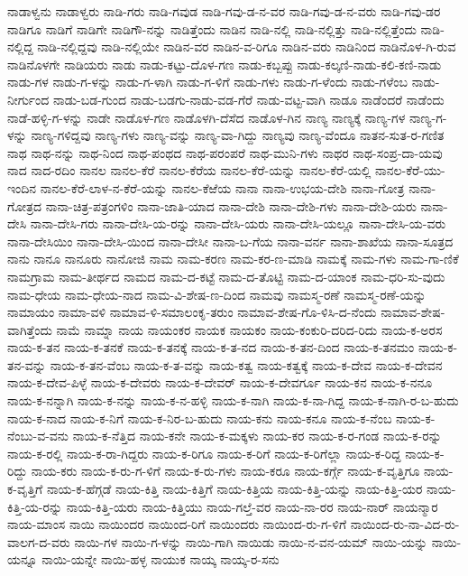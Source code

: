 ನಾಡಾಳ್ವನು
ನಾಡಾಳ್ವರು
ನಾಡಿ-ಗರು
ನಾಡಿ-ಗವುಡ
ನಾಡಿ-ಗವು-ಡ-ನ-ವರ
ನಾಡಿ-ಗವು-ಡ-ನ-ವರು
ನಾಡಿ-ಗವು-ಡರ
ನಾಡಿಗೂ
ನಾಡಿಗೆ
ನಾಡಿಗೇ
ನಾಡಿಗೌ-ನನ್ನು
ನಾಡಿತ್ತೆಂದು
ನಾಡಿನ
ನಾಡಿ-ನಲ್ಲಿ
ನಾಡಿ-ನಲ್ಲಿತ್ತು
ನಾಡಿ-ನಲ್ಲಿತ್ತೆಂದು
ನಾಡಿ-ನಲ್ಲಿದ್ದ
ನಾಡಿ-ನಲ್ಲಿದ್ದವು
ನಾಡಿ-ನಲ್ಲಿಯೇ
ನಾಡಿನ-ವರ
ನಾಡಿನ-ವ-ರಿಗೂ
ನಾಡಿನ-ವರು
ನಾಡಿನಿಂದ
ನಾಡಿನೊಳ-ಗಿ-ರುವ
ನಾಡಿನೊಳಗೇ
ನಾಡಿಯರು
ನಾಡು
ನಾಡು-ಕಟ್ಟು-ದೊಳ-ಗಣ
ನಾಡು-ಕಬ್ಬಪ್ಪು
ನಾಡು-ಕಲ್ಕಣಿ-ನಾಡು-ಕಲಿ-ಕಣಿ-ನಾಡು
ನಾಡು-ಗಳ
ನಾಡು-ಗ-ಳನ್ನು
ನಾಡು-ಗ-ಳಾಗಿ
ನಾಡು-ಗ-ಳಿಗೆ
ನಾಡು-ಗಳು
ನಾಡು-ಗ-ಳೆಂದು
ನಾಡು-ಗಳೆಂಬ
ನಾಡು-ನೀರ್ಗುಂದ
ನಾಡು-ಬಡ-ಗುಂದ
ನಾಡು-ಬಡಗು-ನಾಡು-ವಡ-ಗೆರೆ
ನಾಡು-ವಟ್ಟ-ವಾಗಿ
ನಾಡೂ
ನಾಡೆಂದರೆ
ನಾಡೆಂದು
ನಾಡೆ-ಹಳ್ಳಿ-ಗ-ಳನ್ನು
ನಾಡೇ
ನಾಡೊಳ-ಗಣ
ನಾಡೊಳಗಿ-ದೆಸೆದ
ನಾಡೊಳ-ಗಿನ
ನಾಣ್ಯ
ನಾಣ್ಯಕ್ಕೆ
ನಾಣ್ಯ-ಗಳ
ನಾಣ್ಯ-ಗ-ಳನ್ನು
ನಾಣ್ಯ-ಗಳಿದ್ದವು
ನಾಣ್ಯ-ಗಳು
ನಾಣ್ಯ-ವನ್ನು
ನಾಣ್ಯ-ವಾ-ಗಿದ್ದು
ನಾಣ್ಯವು
ನಾಣ್ಯ-ವೆಂದೂ
ನಾತನ-ಸುತ-ರ-ಗಣಿತ
ನಾಥ
ನಾಥ-ನನ್ನು
ನಾಥ-ನಿಂದ
ನಾಥ-ಪಂಥದ
ನಾಥ-ಪರಂಪರೆ
ನಾಥ-ಮುನಿ-ಗಳು
ನಾಥರ
ನಾಥ-ಸಂಪ್ರ-ದಾ-ಯವು
ನಾದ
ನಾದ-ರದಿಂ
ನಾನಲ
ನಾನಲ-ಕೆರೆ
ನಾನಲ-ಕೆರೆಯ
ನಾನಲ-ಕೆರೆ-ಯನ್ನು
ನಾನಲ-ಕೆರೆ-ಯಲ್ಲಿ
ನಾನಲ-ಕೆರೆ-ಯು-ಇಂದಿನ
ನಾನಲ-ಕೆರೆ-ಲಾಳ-ನ-ಕೆರೆ-ಯನ್ನು
ನಾನಲ-ಕೆಱೆಯ
ನಾನಾ
ನಾನಾ-ಉಭಯ-ದೇಶಿ
ನಾನಾ-ಗೋತ್ರ
ನಾನಾ-ಗೋತ್ರದ
ನಾನಾ-ಚಿತ್ರ-ಪತ್ರಂಗಳಿಂ
ನಾನಾ-ಜಾತಿ-ಯಾದ
ನಾನಾ-ದೇಶಿ
ನಾನಾ-ದೇಶಿ-ಗಳು
ನಾನಾ-ದೇಶಿ-ಯರು
ನಾನಾ-ದೇಸಿ
ನಾನಾ-ದೇಸಿ-ಗರು
ನಾನಾ-ದೇಸಿ-ಯ-ರನ್ನು
ನಾನಾ-ದೇಸಿ-ಯರು
ನಾನಾ-ದೇಸಿ-ಯಲ್ಲೂ
ನಾನಾ-ದೇಸಿ-ಯ-ವರು
ನಾನಾ-ದೇಸಿಯಿಂ
ನಾನಾ-ದೇಸಿ-ಯಿಂದ
ನಾನಾ-ದೇಸೀ
ನಾನಾ-ಬ-ಗೆಯ
ನಾನಾ-ವರ್ನ
ನಾನಾ-ಶಾಖೆಯ
ನಾನಾ-ಸೂತ್ರದ
ನಾನು
ನಾನೂ
ನಾನೂರು
ನಾನೋಜಿ
ನಾಮ
ನಾಮ-ಕರಣ
ನಾಮ-ಕರ-ಣ-ಮಾಡಿ
ನಾಮಕ್ಕೆ
ನಾಮ-ಗಳು
ನಾಮ-ಗಾ-ಣಿಕೆ
ನಾಮಗ್ರಾಮ
ನಾಮ-ತೀರ್ಥದ
ನಾಮದ
ನಾಮ-ದ-ಕಟ್ಟೆ
ನಾಮ-ದ-ತೊಟ್ಟಿ
ನಾಮ-ದ-ಯಾಂಕ
ನಾಮ-ಧರಿ-ಸು-ವುದು
ನಾಮ-ಧೇಯ
ನಾಮ-ಧೇಯ-ನಾದ
ನಾಮ-ವಿ-ಶೇಷ-ಣ-ದಿಂದ
ನಾಮವು
ನಾಮಸ್ಮ-ರಣೆ
ನಾಮಸ್ಮ-ರಣೆ-ಯನ್ನು
ನಾಮಾಯಂ
ನಾಮಾ-ವಳಿ
ನಾಮಾವ-ಳಿ-ಸಮಾಲಂಕೃ-ತರುಂ
ನಾಮಾವ-ಶೇಷ-ಗೊ-ಳಿಸಿ-ದ-ನೆಂದು
ನಾಮಾವ-ಶೇಷ-ವಾಗಿತ್ತೆಂದು
ನಾಮೆ
ನಾಮ್ನಾ
ನಾಯ
ನಾಯಂಕರ
ನಾಯಕ
ನಾಯಕಂ
ನಾಯ-ಕಂಕುರಿ-ದರಿದ-ರಿದು
ನಾಯ-ಕ-ಅರಸ
ನಾಯ-ಕ-ತನ
ನಾಯ-ಕ-ತನಕೆ
ನಾಯ-ಕ-ತನಕ್ಕೆ
ನಾಯ-ಕ-ತ-ನದ
ನಾಯ-ಕ-ತನ-ದಿಂದ
ನಾಯ-ಕ-ತನಮಂ
ನಾಯ-ಕ-ತನ-ವನ್ನು
ನಾಯ-ಕ-ತನ-ವೆಂಬ
ನಾಯ-ಕ-ತ-ವನ್ನು
ನಾಯ-ಕತ್ವ
ನಾಯ-ಕತ್ವಕ್ಕೆ
ನಾಯ-ಕ-ದೇವ
ನಾಯ-ಕ-ದೇವನ
ನಾಯ-ಕ-ದೇವ-ಪಿಳ್ಳೆ
ನಾಯ-ಕ-ದೇವರು
ನಾಯ-ಕ-ದೇವರ್
ನಾಯ-ಕ-ದೇವರ್ಗೂ
ನಾಯ-ಕನ
ನಾಯ-ಕ-ನನೂ
ನಾಯ-ಕ-ನನ್ನಾಗಿ
ನಾಯ-ಕ-ನನ್ನು
ನಾಯ-ಕ-ನ-ಹಳ್ಳಿ
ನಾಯ-ಕ-ನಾಗಿ
ನಾಯ-ಕ-ನಾ-ಗಿದ್ದ
ನಾಯ-ಕ-ನಾಗಿ-ರ-ಬ-ಹುದು
ನಾಯ-ಕ-ನಾದ
ನಾಯ-ಕ-ನಿಗೆ
ನಾಯ-ಕ-ನಿರ-ಬ-ಹುದು
ನಾಯ-ಕನು
ನಾಯ-ಕನೂ
ನಾಯ-ಕ-ನೆಂಬ
ನಾಯ-ಕ-ನೆಂಬು-ವ-ವನು
ನಾಯ-ಕ-ನೆತ್ತಿದ
ನಾಯ-ಕನೇ
ನಾಯ-ಕ-ಮಕ್ಕಳು
ನಾಯ-ಕರ
ನಾಯ-ಕ-ರ-ಗಂಡ
ನಾಯ-ಕ-ರನ್ನು
ನಾಯ-ಕ-ರಲ್ಲಿ
ನಾಯ-ಕ-ರಾ-ಗಿದ್ದರು
ನಾಯ-ಕ-ರಿಗೂ
ನಾಯ-ಕ-ರಿಗೆ
ನಾಯ-ಕ-ರಿಗೆಲ್ಲಾ
ನಾಯ-ಕ-ರಿದ್ದ
ನಾಯ-ಕ-ರಿದ್ದು
ನಾಯ-ಕರು
ನಾಯ-ಕ-ರು-ಗ-ಳಿಗೆ
ನಾಯ-ಕ-ರು-ಗಳು
ನಾಯ-ಕರೂ
ನಾಯ-ಕರ್ಗ್ಗೆ
ನಾಯ-ಕ-ವೃತ್ತಿಗೂ
ನಾಯ-ಕ-ವೃತ್ತಿಗೆ
ನಾಯ-ಕ-ಹೆಗ್ಗಡೆ
ನಾಯ-ಕಿತ್ತಿ
ನಾಯ-ಕಿತ್ತಿಗೆ
ನಾಯ-ಕಿತ್ತಿಯ
ನಾಯ-ಕಿತ್ತಿ-ಯನ್ನು
ನಾಯ-ಕಿತ್ತಿ-ಯರ
ನಾಯ-ಕಿತ್ತಿ-ಯ-ರನ್ನು
ನಾಯ-ಕಿತ್ತಿ-ಯರು
ನಾಯ-ಕಿತ್ತಿಯು
ನಾಯ-ಗಲ್ತೆ-ವರ
ನಾಯ-ನಾ-ರರ
ನಾಯ-ನಾರ್
ನಾಯನ್ಮಾರ
ನಾಯ-ಮಾಂಸ
ನಾಯಿ
ನಾಯಿಂದರ
ನಾಯಿಂದ-ರಿಗೆ
ನಾಯಿಂದರು
ನಾಯಿಂದ-ರು-ಗ-ಳಿಗೆ
ನಾಯಿಂದ-ರು-ನಾ-ವಿದ-ರು-ವಾಲಗ-ದ-ವರು
ನಾಯಿ-ಗಳ
ನಾಯಿ-ಗ-ಳನ್ನು
ನಾಯಿ-ಗಾಗಿ
ನಾಯಿಡು
ನಾಯಿ-ನ-ವನ-ಯಮ್
ನಾಯಿ-ಯನ್ನು
ನಾಯಿ-ಯನ್ನೂ
ನಾಯಿ-ಯನ್ನೇ
ನಾಯಿ-ಹಳ್ಳ
ನಾಯುಕ
ನಾಯ್ಕ
ನಾಯ್ಕ-ರ-ಸನು
